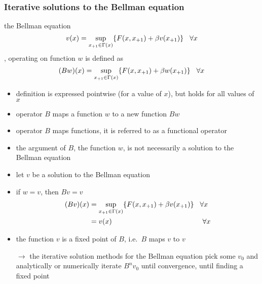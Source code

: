 \documentclass[compress,aspectratio=169]{beamer}
\begin{document}
\begin{frame}
\frametitle{Iterative solutions to the Bellman equation}
the Bellman equation
\begin{displaymath}
v(x)=\sup_{x_{+1}\in \Gamma(x)} \{F(x,x_{+1})+\beta v(x_{+1}) \} \hspace{3 mm} \forall x
\end{displaymath}
{\color{red!70!white}{the Bellman operator}}, operating on function $w$ is defined as
\begin{displaymath}
(Bw)(x)=\sup_{x_{+1}\in \Gamma(x)} \{F(x,x_{+1})+\beta w(x_{+1}) \} \hspace{3 mm} \forall x
\end{displaymath}
\begin{itemize}
\item definition is expressed pointwise (for a value of $x$), but holds for all values of $x$
\item operator $B$ maps a function $w$ to a new function $Bw$
\item operator $B$ maps functions, it is referred to as a functional operator
\item the argument of $B$, the function $w$, is not necessarily a solution to the Bellman equation
\end{itemize}
\end{frame}

\begin{frame}
\begin{itemize}
\item let $v$ be a solution to the Bellman equation
\item if $w=v$, then $Bv=v$
\begin{align*}
(Bv)(x) & = \sup_{x_{+1}\in \Gamma(x)} \{F(x,x_{+1})+\beta v(x_{+1}) \} \hspace{3 mm} \forall x \\
& = v(x) \hspace{45 mm} \forall x \\
\end{align*}
\item the function $v$ is a fixed point of $B$, i.e.\ $B$ maps $v$ to $v$
\vspace{3 mm}
\item[$\rightarrow$] the iterative solution methods for the Bellman equation pick some $v_0$ and analytically or numerically iterate $B^nv_0$ until convergence, until finding a fixed point
\end{itemize}
\end{frame}
\end{document}

